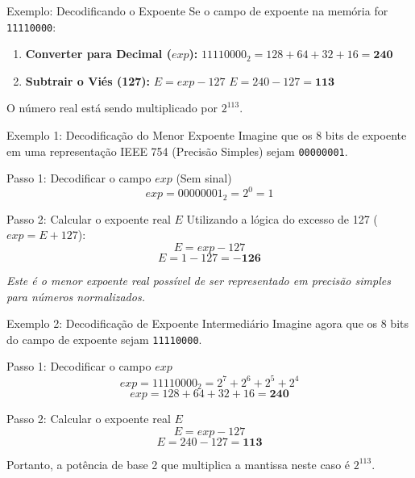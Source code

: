 \begin{frame}{Exemplo: Decodificando o Expoente}
    Se o campo de expoente na memória for \texttt{11110000}:

    \begin{enumerate}
        \item \textbf{Converter para Decimal ($exp$):}
              $11110000_2 = 128 + 64 + 32 + 16 = \mathbf{240}$

        \item \textbf{Subtrair o Viés (127):}
              $E = exp - 127$
              $E = 240 - 127 = \mathbf{113}$
    \end{enumerate}

    O número real está sendo multiplicado por $2^{113}$.
\end{frame}

\begin{frame}{Exemplo 1: Decodificação do Menor Expoente}
    Imagine que os 8 bits de expoente em uma representação IEEE 754 (Precisão Simples) sejam \texttt{00000001}.

    \begin{exampleblock}{Passo 1: Decodificar o campo $exp$ (Sem sinal)}
        $$exp = 00000001_2 = 2^0 = 1$$
    \end{exampleblock}

    \begin{exampleblock}{Passo 2: Calcular o expoente real $E$}
        Utilizando a lógica do excesso de 127 ($exp = E + 127$):
        $$E = exp - 127$$
        $$E = 1 - 127 = \mathbf{-126}$$
    \end{exampleblock}

    \textit{Este é o menor expoente real possível de ser representado em precisão simples para números normalizados.}
\end{frame}

\begin{frame}{Exemplo 2: Decodificação de Expoente Intermediário}
    Imagine agora que os 8 bits do campo de expoente sejam \texttt{11110000}.

    \begin{exampleblock}{Passo 1: Decodificar o campo $exp$}
        $$exp = 11110000_2 = 2^7 + 2^6 + 2^5 + 2^4$$
        $$exp = 128 + 64 + 32 + 16 = \mathbf{240}$$
    \end{exampleblock}

    \begin{exampleblock}{Passo 2: Calcular o expoente real $E$}
        $$E = exp - 127$$
        $$E = 240 - 127 = \mathbf{113}$$
    \end{exampleblock}

    Portanto, a potência de base 2 que multiplica a mantissa neste caso é $2^{113}$.
\end{frame}

